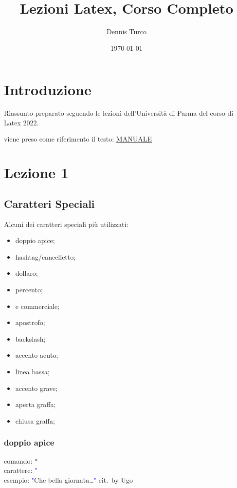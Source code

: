 \documentclass{report}
\title{Lezioni Latex, Corso Completo}
\author{Dennis Turco}
\date{\today}
\begin{document}
    \maketitle %
    \tableofcontents %

    \chapter{Introduzione}
        Riassunto preparato seguendo le lezioni dell'Università di Parma del corso di Latex 2022.

        viene preso come riferimento il testo: \href{https://www.dei.unipd.it/~addetto/manuali_online/ArteLaTeX.pdf}{MANUALE}
    

    \chapter{Lezione 1}

        \section{Caratteri Speciali}
        Alcuni dei caratteri speciali più utilizzati:

        \begin{itemize}
            \item doppio apice;
            \item hashtag/cancelletto;
            \item dollaro;
            \item percento;
            \item e commerciale;
            \item apostrofo;
            \item backslash;
            \item accento acuto;
            \item linea bassa;
            \item accento grave;
            \item aperta graffa;
            \item chiusa graffa; 
        \end{itemize}

        \subsection{doppio apice}
            comando: \verb!"! \\
            carattere: \textcolor{blue}{"} \\
            esempio: \textcolor{blue}{"}Che bella giornata\ldots \textcolor{blue}{"} cit.\ by Ugo
\end{document}
